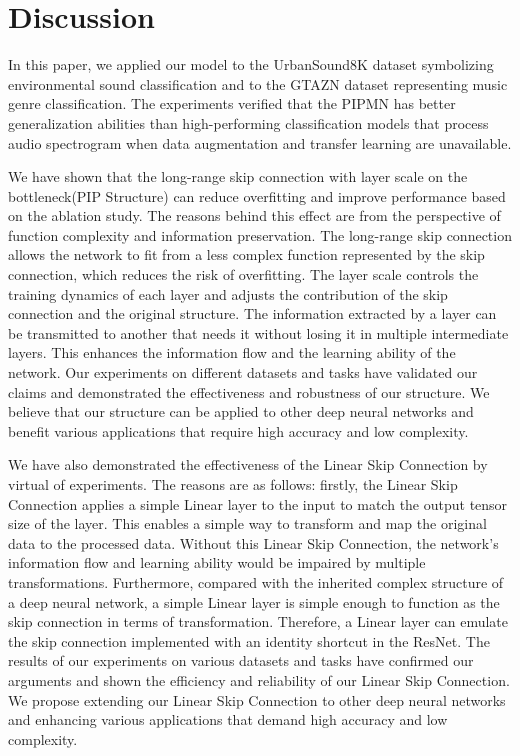\documentclass[runningheads]{llncs}
\begin{document}
\section{Discussion}
In this paper, we applied our model to the UrbanSound8K dataset symbolizing environmental sound classification and to the GTAZN dataset representing music genre classification. The experiments verified that the PIPMN has better generalization abilities than high-performing classification models that process audio spectrogram when data augmentation and transfer learning  are unavailable. 

We have shown that the long-range skip connection with layer scale on the bottleneck(PIP Structure) can reduce overfitting and improve performance based on the ablation study. The reasons behind this effect are from the perspective of function complexity and information preservation. The long-range skip connection allows the network to fit from a less complex function represented by the skip connection, which reduces the risk of overfitting. The layer scale controls the training dynamics of each layer and adjusts the contribution of the skip connection and the original structure. The information extracted by a layer can be transmitted to another that needs it without losing it in multiple intermediate layers. This enhances the information flow and the learning ability of the network. Our experiments on different datasets and tasks have validated our claims and demonstrated the effectiveness and robustness of our structure. We believe that our structure can be applied to other deep neural networks and benefit various applications that require high accuracy and low complexity.

We have also demonstrated the effectiveness of the Linear Skip Connection by virtual of experiments. The reasons are as follows: firstly, the Linear Skip Connection applies a simple Linear layer to the input to match the output tensor size of the layer. This enables a simple way to transform and map the original data to the processed data. Without this Linear Skip Connection, the network's information flow and learning ability would be impaired by multiple transformations. Furthermore, compared with the inherited complex structure of a deep neural network, a simple Linear layer is simple enough to function as the skip connection in terms of transformation. Therefore, a Linear layer can emulate the skip connection implemented with an identity shortcut in the ResNet. The results of our experiments on various datasets and tasks have confirmed our arguments and shown the efficiency and reliability of our Linear Skip Connection. We propose extending our Linear Skip Connection to other deep neural networks and enhancing various applications that demand high accuracy and low complexity.
\end{document}
